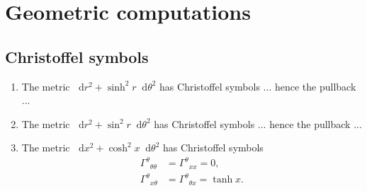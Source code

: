 \documentclass[reqno,11pt]{amsart}
\newcommand*\dif{\mathop{}\!\mathrm{d}}
\theoremstyle{definition}
\numberwithin{equation}{section}
\begin{document}
\appendix 
\section{Geometric computations}
\subsection{Christoffel symbols}
\begin{enumerate}
\item The metric $\dif r^2 + \sinh^2 r \dif \theta^2$ has Christoffel symbols ... hence the pullback ... 
\item The metric $\dif r^2 + \sin^2 r \dif \theta^2$ has Christoffel symbols ... hence the pullback ... 
\item The metric $\dif x^2 + \cosh^2 x \dif \theta^2$ has Christoffel symbols 
\begin{align}
{\Gamma^\theta}_{\theta \theta} &= {\Gamma^\theta}_{x x} = 0, \label{hyperbolic cylinder 1} \\
{\Gamma^\theta}_{x \theta} &= {\Gamma^\theta}_{\theta x} = \tanh x. \label{hyperbolic cylinder 2}
\end{align}
\end{enumerate}


\printbibliography
\end{document}
